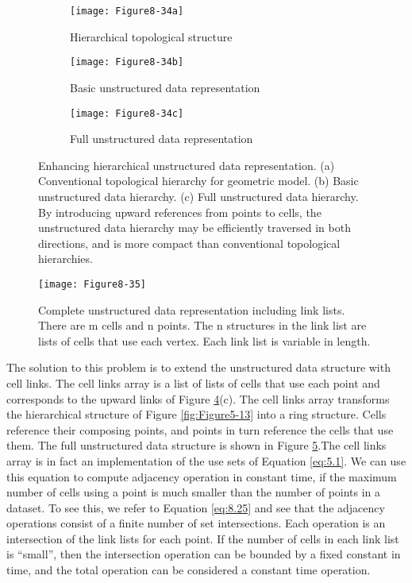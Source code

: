 \begin{figure}[!htb]
    \centering
    \begin{subfigure}{0.32\linewidth}
        \centering
        \texttt{[image: Figure8-34a]}
        \caption{Hierarchical topological
        structure}\label{fig:Figure8-34a}
    \end{subfigure}
    \hfill
    \begin{subfigure}{0.32\linewidth}
        \centering
        \texttt{[image: Figure8-34b]}
        \caption{Basic unstructured data representation}\label{fig:Figure8-34b}
    \end{subfigure}%
    \hfill
    \begin{subfigure}{0.32\linewidth}
        \centering
        \texttt{[image: Figure8-34c]}
        \caption{Full unstructured data representation}\label{fig:Figure8-34c}
    \end{subfigure}%
    \caption{Enhancing hierarchical unstructured data representation. (a) Conventional topological hierarchy for geometric model. (b) Basic unstructured data hierarchy. (c) Full unstructured data hierarchy. By introducing upward references from points to cells, the unstructured data hierarchy may be efficiently traversed in both directions, and is more compact than conventional topological hierarchies.}
    \label{fig:Figure8-34}
\end{figure}

\begin{figure}[!htb]
    \centering
    \texttt{[image: Figure8-35]}\\
    \caption{Complete unstructured data representation including link lists. There are m cells and n points. The n structures in the link list are lists of cells that use each vertex. Each link list is variable in length.}\label{fig:Figure8-35}
\end{figure}


The solution to this problem is to extend the unstructured data structure with cell links. The cell links array is a list of lists of cells that use each point and corresponds to the upward links of Figure \ref{fig:Figure8-34}(c). The cell links array transforms the hierarchical structure of Figure \ref{fig:Figure5-13} into a ring structure. Cells reference their composing points, and points in turn reference the cells that use them. The full unstructured data structure is shown in Figure \ref{fig:Figure8-35}.The cell links array is in fact an implementation of the use sets of Equation \ref{eq:5.1}. We can use this equation to compute adjacency operation in constant time, if the maximum number of cells using a point is much smaller than the number of points in a dataset. To see this, we refer to Equation \ref{eq:8.25} and see that the adjacency operations consist of a finite number of set intersections. Each operation is an intersection of the link lists for each point. If the number of cells in each link list is ``small'', then the intersection operation can be bounded by a fixed constant in time, and the total operation can be considered a constant time operation.

